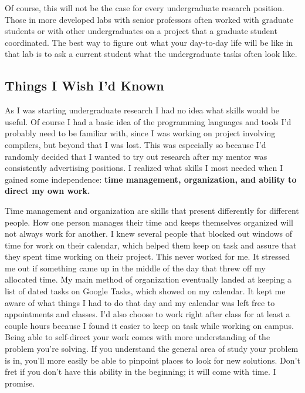 \documentclass[12pt]{article}
\begin{document}
Of course, this will not be the case for every undergraduate research position. Those in more developed labs with senior professors often worked with graduate students or with other undergraduates on a project that a graduate student coordinated. The best way to figure out what your day-to-day life will be like in that lab is to ask a current student what the undergraduate tasks often look like.

\subsection{Things I Wish I'd Known}

As I was starting undergraduate research I had no idea what skills would be useful. Of course I had a basic idea of the programming languages and tools I'd probably need to be familiar with, since I was working on project involving compilers, but beyond that I was lost. This was especially so because I'd randomly decided that I wanted to try out research after my mentor was consistently advertising positions. I realized what skills I most needed when I gained some independence: \textbf{time management, organization, and ability to direct my own work.}

Time management and organization are skills that present differently for different people. How one person manages their time and keeps themselves organized will not always work for another. I knew several people that blocked out windows of time for work on their calendar, which helped them keep on task and assure that they spent time working on their project. This never worked for me. It stressed me out if something came up in the middle of the day that threw off my allocated time. My main method of organization eventually landed at keeping a list of dated tasks on Google Tasks, which showed on my calendar. It kept me aware of what things I had to do that day and my calendar was left free to appointments and classes. I'd also choose to work right after class for at least a couple hours because I found it easier to keep on task while working on campus. Being able to self-direct your work comes with more understanding of the problem you're solving. If you understand the general area of study your problem is in, you'll more easily be able to pinpoint places to look for new solutions. Don't fret if you don't have this ability in the beginning; it will come with time. I promise.
\end{document}
